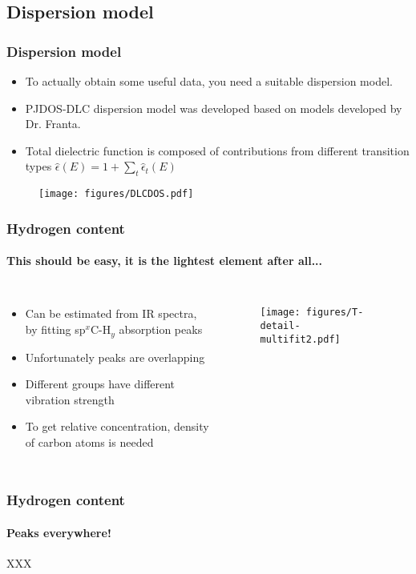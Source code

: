 \documentclass{beamer}
\begin{document}
\subsection{Dispersion model}
\begin{frame}
    \frametitle{Dispersion model}
   \begin{itemize}
	\item To actually obtain some useful data, you need a suitable dispersion model.
	\item PJDOS-DLC dispersion model was developed based on models developed by Dr. Franta. 
	\item Total dielectric function is composed of contributions from different transition types $\hat{\epsilon}(E) = 1 + \sum_t \hat{\epsilon}_t(E)$
   \end{itemize} 
 
   \begin{figure}
   \begin{center}
	\texttt{[image: figures/DLCDOS.pdf]}
   \end{center}
	\end{figure}
   
\end{frame}

\begin{frame}
    \frametitle{Hydrogen content}
   \framesubtitle{This should be easy, it is the lightest element after all...}
	\begin{columns}[c]
	\begin{itemize}
	\item Can be estimated from IR spectra, by fitting sp$^x$C-H$_y$ absorption peaks
   \item Unfortunately peaks are overlapping
   \item Different groups have different vibration strength
   \item To get relative concentration, density of carbon atoms is needed
   \end{itemize}

	\begin{figure}
	\texttt{[image: figures/T-detail-multifit2.pdf]}
	\end{figure}

   \end{columns}

\end{frame}

\begin{frame}
    \frametitle{Hydrogen content}
   \framesubtitle{Peaks everywhere!}

   XXX

\end{frame}
\end{document}
